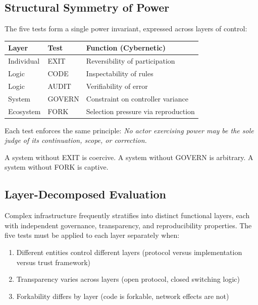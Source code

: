 \subsection{Structural Symmetry of Power}

The five tests form a single power invariant, expressed across layers of control:

\begin{center}
\begin{tabular}{@{}lll@{}}
\toprule
\textbf{Layer} & \textbf{Test} & \textbf{Function (Cybernetic)} \\
\midrule
Individual & EXIT & Reversibility of participation \\
Logic & CODE & Inspectability of rules \\
Logic & AUDIT & Verifiability of error \\
System & GOVERN & Constraint on controller variance \\
Ecosystem & FORK & Selection pressure via reproduction \\
\bottomrule
\end{tabular}
\end{center}

Each test enforces the same principle: \textit{No actor exercising power may be the sole judge of its continuation, scope, or correction.}

A system without EXIT is coercive. A system without GOVERN is arbitrary. A system without FORK is captive.

\subsection{Layer-Decomposed Evaluation}
\label{subsec:layers}

Complex infrastructure frequently stratifies into distinct functional layers, each with independent governance, transparency, and reproducibility properties. The five tests must be applied to each layer separately when:

\begin{enumerate}[noitemsep,topsep=0pt]
    \item Different entities control different layers (protocol versus implementation versus trust framework)
    \item Transparency varies across layers (open protocol, closed switching logic)
    \item Forkability differs by layer (code is forkable, network effects are not)
\end{enumerate}

